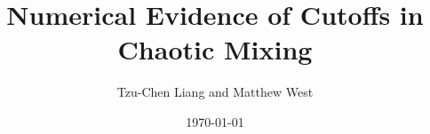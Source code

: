 \documentclass{article}
\title{Numerical Evidence of Cutoffs in Chaotic Mixing}
\author{Tzu-Chen Liang and Matthew West}
\date{\today}
\begin{document}
\maketitle
\begin{abstract}

\end{abstract}












 

\end{document}
